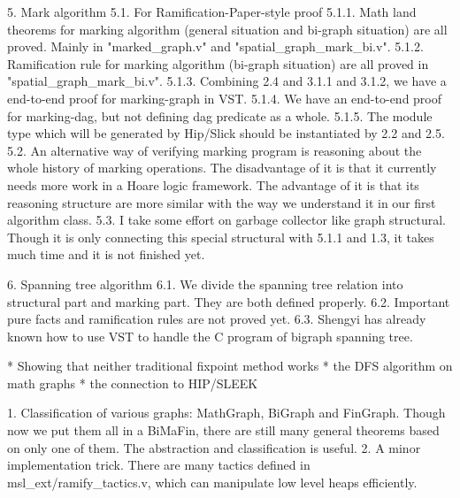 \documentclass[pldi]{sigplanconf-pldi15}
\begin{document}
{5. Mark algorithm
5.1. For Ramification-Paper-style proof
5.1.1. Math land theorems for marking algorithm (general situation and bi-graph situation) are all proved. Mainly in "marked_graph.v" and "spatial_graph_mark_bi.v".
5.1.2. Ramification rule for marking algorithm (bi-graph situation) are all proved in "spatial_graph_mark_bi.v".
5.1.3. Combining 2.4 and 3.1.1 and 3.1.2, we have a end-to-end proof for marking-graph in VST.
5.1.4. We have an end-to-end proof for marking-dag, but not defining dag predicate as a whole.
5.1.5. The module type which will be generated by Hip/Slick should be instantiated by 2.2 and 2.5.
5.2. An alternative way of verifying marking program is reasoning about the whole history of marking operations. The disadvantage of it is that it currently needs more work in a Hoare logic framework. The advantage of it is that its reasoning structure are more similar with the way we understand it in our first algorithm class.
5.3. I take some effort on garbage collector like graph structural. Though it is only connecting this special structural with 5.1.1 and 1.3, it takes much time and it is not finished yet.

6. Spanning tree algorithm
6.1. We divide the spanning tree relation into structural part and marking part. They are both defined properly.
6.2. Important pure facts and ramification rules are not proved yet.
6.3. Shengyi has already known how to use VST to handle the C program of bigraph spanning tree.

* Showing that neither traditional fixpoint method works
* the DFS algorithm on math graphs
* the connection to HIP/SLEEK

1. Classification of various graphs: MathGraph, BiGraph and FinGraph. Though now we put them all in a BiMaFin, there are still many general theorems based on only one of them. The abstraction and classification is useful.
2. A minor implementation trick. There are many tactics defined in msl_ext/ramify_tactics.v, which can manipulate low level heaps efficiently.
}
\end{document}
